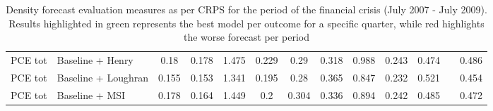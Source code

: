 \begin{table}[H]
{\begin{tabular}{llcccccccccp{1ex}c}
PCE tot	&	Baseline + Henry	&	0.18	&	0.178	&	1.475	&	0.229	&	0.29	&	0.318	&	0.988	&	0.243	&	0.474	&&	0.486	\\
PCE tot	&	Baseline + Loughran	&	0.155	&	\cellcolor{green!25}0.153	&	\cellcolor{green!25}1.341	&	\cellcolor{green!25}0.195	&	0.28	&	\cellcolor{red!25}0.365	&	\cellcolor{green!25}0.847	&	0.232	&	\cellcolor{red!25}0.521	&&	\cellcolor{green!25}0.454\\
PCE tot	&	Baseline + MSI	&	0.178	&	0.164	&	1.449	&	0.2	&	\cellcolor{red!25}0.304	&	0.336	&	0.894	&	0.242	&	0.485	&&	0.472	\\
	\hline
\end{tabular}
	}
	\caption{Density forecast evaluation measures as per CRPS for the period of the financial crisis (July 2007 - July 2009). Results highlighted in green represents the best model per outcome for a specific quarter, while red highlights the worse forecast per period}
	\label{tab:fin_crisis}
\end{table}
